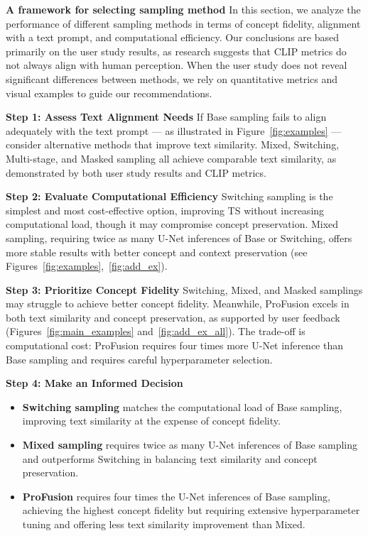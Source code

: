 \textbf{A framework for selecting sampling method}
In this section, we analyze the performance of different sampling methods in terms of concept fidelity, alignment with a text prompt, and computational efficiency. Our conclusions are based primarily on the user study results, as research suggests that CLIP metrics do not always align with human perception. When the user study does not reveal significant differences between methods, we rely on quantitative metrics and visual examples to guide our recommendations.

\textbf{Step 1: Assess Text Alignment Needs}
If Base sampling fails to align adequately with the text prompt — as illustrated in Figure~\ref{fig:examples} — consider alternative methods that improve text similarity. Mixed, Switching, Multi-stage, and Masked sampling all achieve comparable text similarity, as demonstrated by both user study results and CLIP metrics.

\textbf{Step 2: Evaluate Computational Efficiency} Switching sampling is the simplest and most cost-effective option, improving TS without increasing computational load, though it may compromise concept preservation. Mixed sampling, requiring twice as many U-Net inferences of Base or Switching, offers more stable results with better concept and context preservation (see Figures~\ref{fig:examples},~\ref{fig:add_ex}).

\textbf{Step 3: Prioritize Concept Fidelity} Switching, Mixed, and Masked samplings may struggle to achieve better concept fidelity. Meanwhile, ProFusion excels in both text similarity and concept preservation, as supported by user feedback (Figures~\ref{fig:main_examples} and~\ref{fig:add_ex_all}). The trade-off is computational cost: ProFusion requires four times more U-Net inference than Base sampling and requires careful hyperparameter selection.

\textbf{Step 4: Make an Informed Decision}

\begin{itemize}
    \item \textbf{Switching sampling} matches the computational load of Base sampling, improving text similarity at the expense of concept fidelity.
    \item \textbf{Mixed sampling} requires twice as many U-Net inferences of Base sampling and outperforms Switching in balancing text similarity and concept preservation.
    \item \textbf{ProFusion} requires four times the U-Net inferences of Base sampling, achieving the highest concept fidelity but requiring extensive hyperparameter tuning and offering less text similarity improvement than Mixed.
\end{itemize}
